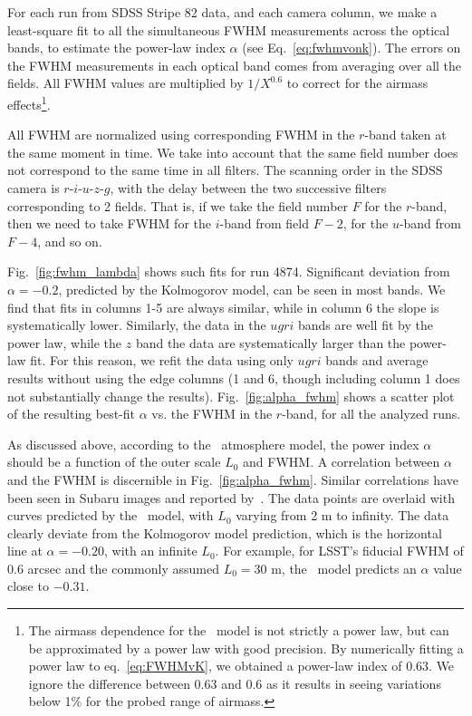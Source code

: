  
For each run from SDSS Stripe 82 data, and each camera column, we make
a least-square fit to all the simultaneous FWHM measurements across the optical bands, to
estimate the power-law index $\alpha$ (see Eq.~\ref{eq:fwhmvonk}). 
The errors on the FWHM measurements in each optical band comes from
averaging over all the fields.
All FWHM values are multiplied by $1/X^{0.6}$ to 
correct for the airmass effects\footnote{The airmass dependence for the \vk~model 
is not strictly a power law, but can be approximated by a power law with good precision.
By numerically fitting a power law to eq.~\ref{eq:FWHMvK}, we obtained a power-law index 
of 0.63. We ignore the difference between 0.63 and 0.6 as it results in seeing variations 
below 1\% for the probed range of airmass.}.

All FWHM are normalized using 
corresponding FWHM in the $r$-band taken at the same moment in time. 
We take into account that the same field number does not correspond to the same
time in all filters. The scanning order in the SDSS camera is $r$-$i$-$u$-$z$-$g$, with the delay between the two 
successive filters corresponding to 2 fields. That is, if we take the field number $F$ for the $r$-band, then
we need to take FWHM for the $i$-band from field $F-2$, for the $u$-band
from $F-4$, and so on. 

Fig.~\ref{fig:fwhm_lambda} shows such fits for run 4874. Significant deviation 
from $\alpha = -0.2$, predicted by the Kolmogorov model, can be seen in most bands.
We find that fits in columns 1-5 are always similar, while in column 6 the slope is 
systematically lower. Similarly, the data in the $ugri$ bands are well fit by the power law, 
while the $z$ band the data are systematically larger than the power-law fit. 
For this reason, we refit the data using only $ugri$ bands and average results without
using the edge columns (1 and 6, though including column 1 does not substantially change 
the results). Fig.~\ref{fig:alpha_fwhm} shows a scatter plot of the resulting
best-fit $\alpha$ vs. the FWHM in the $r$-band, for all the analyzed runs.
 
As discussed above, according to the \vk~atmosphere model, the
power index $\alpha$ should be a function of the outer scale $L_0$ and 
FWHM. A correlation between $\alpha$ and the FWHM is discernible in
Fig.~\ref{fig:alpha_fwhm}. Similar correlations have been seen in Subaru images 
and reported by~\cite{subaruSeeing2016}.
The data points are overlaid with curves predicted by the 
\vk~model, with $L_0$ varying from 2 m to infinity.
The data clearly deviate from the Kolmogorov model prediction, which is
the horizontal line at $\alpha = -0.20$, with an infinite $L_0$.
For example, for LSST's fiducial FWHM of 0.6 arcsec and the commonly assumed 
$L_0 = 30$ m, the \vk~model predicts an $\alpha$ value close to $-0.31$.



